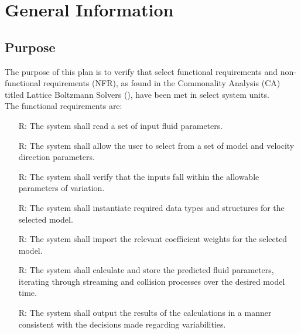 \documentclass[12pt, titlepage]{article}
\newcounter{reqnum} %
\begin{document}
\section{General Information}
\label{generalinfo}

\subsection{Purpose}
\label{purpose}

\noindent The purpose of this plan is to verify that select functional requirements and non-functional requirements (NFR), as found in the Commonality Analysis (CA) titled Lattice Boltzmann Solvers (\citet{LBM_CA_PM}), have been met in select system units.\\ 

\noindent The functional requirements are:\\
\noindent \begin{itemize}
\item[R\refstepcounter{reqnum}\thereqnum \label{R_Inputs}:] The system shall read a set of input fluid parameters.

\item[R\refstepcounter{reqnum}\thereqnum \label{R_ModelInputs}:] The system shall allow the user to select from a set of model and velocity direction parameters.

\item[R\refstepcounter{reqnum}\thereqnum \label{R_CheckInputs}:] The system shall verify that the inputs fall within the allowable parameters of variation.

\item[R\refstepcounter{reqnum}\thereqnum \label{R_Instantiate}:] The system shall instantiate required data types and structures for the selected model.

\item[R\refstepcounter{reqnum}\thereqnum \label{R_CoefficientWeights}:] The system shall import the relevant coefficient weights for the selected model.

\item[R\refstepcounter{reqnum}\thereqnum \label{R_Calculate}:] The system shall calculate and store the predicted fluid parameters, iterating through streaming and collision processes over the desired model time.

\item[R\refstepcounter{reqnum}\thereqnum \label{R_Output}:] The system shall output the results of the calculations in a manner consistent with the decisions made regarding variabilities.\\

\end{itemize}
\end{document}
